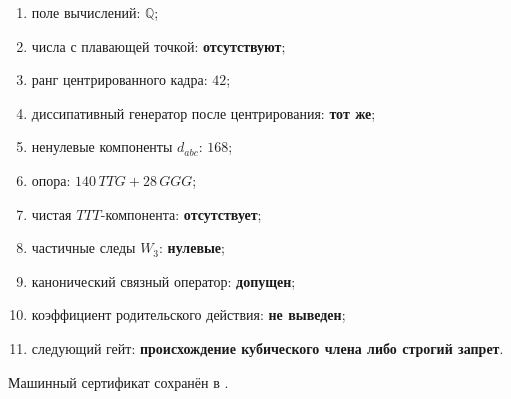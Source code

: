 \begin{protocol}
\begin{enumerate}
 \item поле вычислений: \textbf{$\mathbb Q$};
 \item числа с плавающей точкой: \textbf{отсутствуют};
 \item ранг центрированного кадра: \textbf{$42$};
 \item диссипативный генератор после центрирования: \textbf{тот же};
 \item ненулевые компоненты $d_{abc}$: \textbf{$168$};
 \item опора: \textbf{$140\,TTG+28\,GGG$};
 \item чистая $TTT$-компонента: \textbf{отсутствует};
 \item частичные следы $W_3$: \textbf{нулевые};
 \item канонический связный оператор: \textbf{допущен};
 \item коэффициент родительского действия: \textbf{не выведен};
 \item следующий гейт:
       \textbf{происхождение кубического члена либо строгий запрет}.
\end{enumerate}
\end{protocol}

Машинный сертификат сохранён в
.